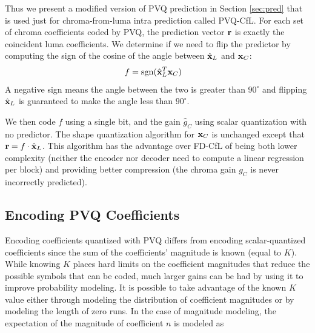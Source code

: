 \documentclass[conference, 10pt]{IEEEtran}
\def\sgn{\mathop{\rm sgn}}
\begin{document}
Thus we present a modified version of PVQ prediction in Section \ref{sec:pred}
 that is used just for chroma-from-luma intra prediction called PVQ-CfL.
For each set of chroma coefficients coded by PVQ, the prediction vector
 ${\bf r}$ is exactly the coincident luma coefficients.
We determine if we need to flip the predictor by computing the sign of the
 cosine of the angle between $\hat{{\bf x}}_L$ and ${\bf x}_C$:
\begin{align}
f & = \sgn(\hat{{\bf x}}_L^T {\bf x}_C)
\end{align}
A negative sign means the angle between the two is greater than $90^{\circ}$
 and flipping $\hat{{\bf x}}_L$ is guaranteed to make the angle less than
 $90^{\circ}$.

We then code $f$ using a single bit\footnotemark[3], and the gain
 $\hat{g}_C$ using scalar quantization with no predictor.
The shape quantization algorithm for ${\bf x}_C$ is unchanged except that
 ${\bf r} = f\cdot \hat{{\bf x}}_L$.
This algorithm has the advantage over FD-CfL of being both lower complexity
 (neither the encoder nor decoder need to compute a linear regression per block)
 and providing better compression (the chroma gain $g_C$ is never incorrectly
 predicted).

\subsection{Encoding PVQ Coefficients}

Encoding coefficients quantized with PVQ differs from encoding scalar-quantized
 coefficients since the sum of the coefficients' magnitude is known (equal to
 $K$).
While knowing $K$ places hard limits on the coefficient magnitudes that reduce
 the possible symbols that can be coded, much larger gains can be had by using
 it to improve probability modeling.
It is possible to take advantage of the known $K$ value either through modeling
 the distribution of coefficient magnitudes or by modeling the length of zero
 runs.
In the case of magnitude modeling, the expectation of the magnitude of
 coefficient $n$ is modeled as
\end{document}
